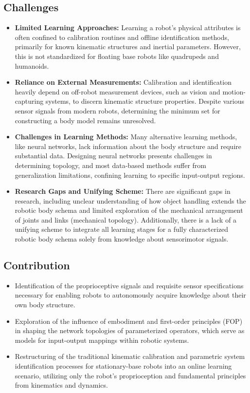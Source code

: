 \documentclass[12pt, a4paper]{article}
\begin{document}
\subsection*{Challenges}
\begin{itemize}
    \item \textbf{Limited Learning Approaches:} Learning a robot's physical attributes is often confined to calibration routines and offline identification methods, primarily for known kinematic structures and inertial parameters. However, this is not standardized for floating base robots like quadrupeds and humanoids.

	\item \textbf{Reliance on External Measurements:} Calibration and identification heavily depend on off-robot measurement devices, such as vision and motion-capturing systems, to discern kinematic structure properties. Despite various sensor signals from modern robots, determining the minimum set for constructing a body model remains unresolved.

	\item \textbf{Challenges in Learning Methods:} Many alternative learning methods, like neural networks, lack information about the body structure and require substantial data. Designing neural networks presents challenges in determining topology, and most data-based methods suffer from generalization limitations, confining learning to specific input-output regions.

	\item \textbf{Research Gaps and Unifying Scheme:} There are significant gaps in research, including unclear understanding of how object handling extends the robotic body schema and limited exploration of the mechanical arrangement of joints and links (mechanical topology). Additionally, there is a lack of a unifying scheme to integrate all learning stages for a fully characterized robotic body schema solely from knowledge about sensorimotor signals. 
\end{itemize}

\subsection*{Contribution}
\begin{itemize}
	\item Identification of the proprioceptive signals and requisite sensor specifications necessary for enabling robots to autonomously acquire knowledge about their own body structure.	
	\item Exploration of the influence of embodiment and first-order principles (FOP) in shaping the network topologies of parameterized operators, which serve as models for input-output mappings within robotic systems. 	
	\item Restructuring of the traditional kinematic calibration and parametric system identification processes for stationary-base robots into an online learning scenario, utilizing only the robot's proprioception and fundamental principles from kinematics and dynamics.
\end{itemize}
\end{document}
